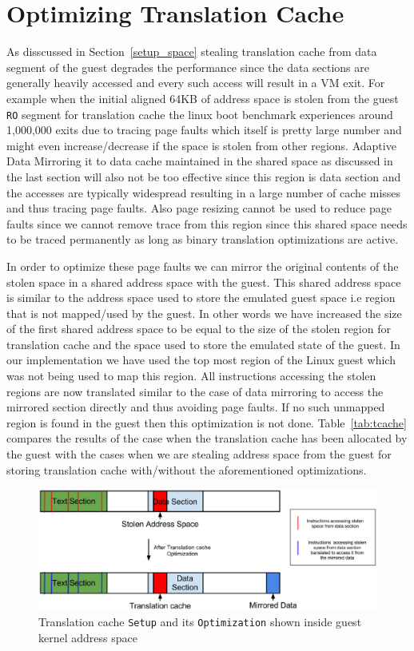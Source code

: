 \section{Optimizing Translation Cache}
\label{tcache_optimizations}
As disscussed in Section~\ref{setup_space} stealing translation cache from data segment of the guest degrades the performance since the data sections are generally heavily accessed and every such access will result in a VM exit. For example when the initial aligned 64KB of address space is stolen from the guest {\tt RO} segment for translation cache the linux boot benchmark experiences around 1,000,000 exits due to tracing page faults which itself is pretty large number and might even increase/decrease if the space is stolen from other regions. Adaptive Data Mirroring it to data cache maintained in the shared space as discussed in the last section will also not be too effective since this region is data section and the accesses are typically widespread resulting in a large number of cache misses and thus tracing page faults. Also page resizing cannot be used to reduce page faults since we cannot remove trace from this region since this shared space needs to be traced permanently as long as binary translation optimizations are active.

In order to optimize these page faults we can mirror the original contents of the stolen space in a shared address space with the guest. This shared address space is similar to the address space used to store the emulated guest space i.e region that is not mapped/used by the guest. In other words we have increased the size of the first shared address space to be equal to the size of the stolen region for translation cache and the space used to store the emulated state of the guest. In our implementation we have used the top most region of the Linux guest which was not being used to map this region. All instructions accessing the stolen regions are now translated similar to the case of data mirroring to access the mirrored section directly and thus avoiding page faults. If no such unmapped region is found in the guest then this optimization is not done. Table~\ref{tab:tcache} compares the results of the case when the translation cache has been allocated by the guest with the cases when we are stealing address space from the guest for storing translation cache with/without the aforementioned optimizations.

\begin{figure}[!htb]
\centering
\includegraphics[scale=0.4]{tcache_opt.eps}
\caption{\label{fig:translation_cache_stealing}Translation cache {\tt Setup} and its {\tt Optimization} shown inside guest kernel address space}
\end{figure}

